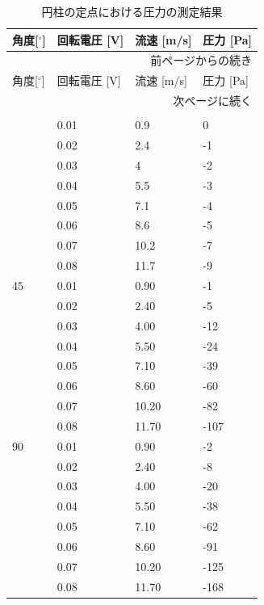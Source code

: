 \documentclass[a4paper,11pt,uplatex]{jsarticle}
\begin{document}
\begin{longtable}{llll}
\caption{円柱の定点における圧力の測定結果} \label{定点表} \\
角度[$^\circ$] & 回転電圧 [V]& 流速 [m/s]& 圧力 [Pa] \\ \hline \hline
\endfirsthead
\multicolumn{4}{r}{前ページからの続き} \\ \hline
角度[$^\circ$] & 回転電圧 [V]& 流速 [m/s]& 圧力 [Pa]  \\ \hline\hline
\endhead
\hline
\multicolumn{4}{r}{次ページに続く} \\
\endfoot
\hline
\multicolumn{4}{r}{以上} \\
\endlastfoot
0 & 0.01 & 0.9 & 0 \\ \cline{2-4}
 & 0.02 & 2.4 & -1 \\ \cline{2-4}
 & 0.03 & 4 & -2 \\ \cline{2-4}
 & 0.04 & 5.5 & -3 \\ \cline{2-4}
 & 0.05 & 7.1 & -4 \\ \cline{2-4}
 & 0.06 & 8.6 & -5 \\ \cline{2-4}
 & 0.07 & 10.2 & -7 \\ \cline{2-4}
 & 0.08 & 11.7 & -9 \\ \hline  \hline
45 & 0.01 & 0.90 & -1 \\ \cline{2-4}
 & 0.02 & 2.40 & -5 \\ \cline{2-4}
 & 0.03 & 4.00 & -12 \\ \cline{2-4}
 & 0.04 & 5.50 & -24 \\ \cline{2-4}
 & 0.05 & 7.10 & -39 \\ \cline{2-4}
 & 0.06 & 8.60 & -60 \\ \cline{2-4}
 & 0.07 & 10.20 & -82 \\ \cline{2-4}
 & 0.08 & 11.70 & -107 \\ \hline \hline
90 & 0.01 & 0.90 & -2 \\ \cline{2-4}
 & 0.02 & 2.40 & -8 \\ \cline{2-4}
 & 0.03 & 4.00 & -20 \\ \cline{2-4}
 & 0.04 & 5.50 & -38 \\ \cline{2-4}
 & 0.05 & 7.10 & -62 \\ \cline{2-4}
 & 0.06 & 8.60 & -91 \\ \cline{2-4}
 & 0.07 & 10.20 & -125 \\ \cline{2-4}
 & 0.08 & 11.70 & -168 \\ \hline \hline

\end{longtable}
\end{document}
